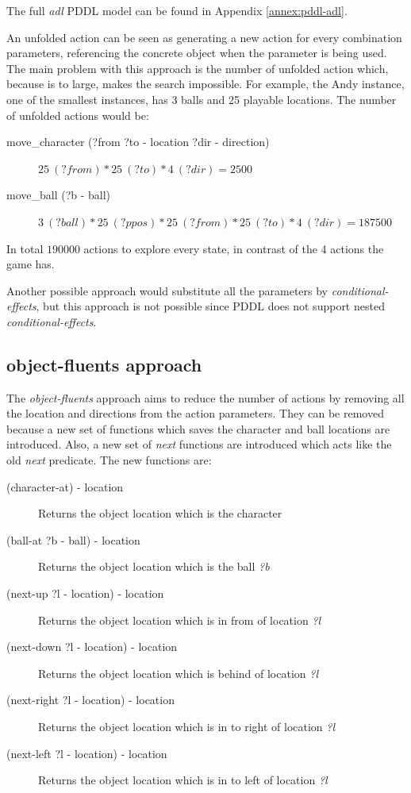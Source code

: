 \documentclass{report}
\theoremstyle{plain}
\begin{document}
The full \emph{adl} PDDL model can be found in Appendix \ref{annex:pddl-adl}.

An unfolded action can be seen as generating a new action for every combination parameters, referencing the concrete object when the parameter is being used. The main problem with this approach is the number of unfolded action which, because is to large, makes the search impossible. For example, the Andy instance, one of the smallest instances, has 3 balls and 25 playable locations. The number of unfolded actions would be:
\begin{description}
    \item[move\_character (?from ?to - location ?dir - direction)] $25\ (?from) * 25\ (?to) * 4\ (?dir) = 2500$
    \item[move\_ball (?b - ball)] $3\ (?ball) * 25\ (?ppos) * 25\ (?from) * 25\ (?to) * 4\ (?dir) = 187500$
\end{description}
In total $190000$ actions to explore every state, in contrast of the 4 actions the game has.

Another possible approach would substitute all the parameters by \emph{conditional-effects}, but this approach is not possible since PDDL does not support nested  \emph{conditional-effects}.

\subsection{object-fluents approach}
The \emph{object-fluents} approach aims to reduce the number of actions by removing all the location and directions from the action parameters. They can be removed because a new set of functions which saves the character and ball locations are introduced. Also, a new set of \emph{next} functions are introduced which acts like the old \emph{next} predicate. The new functions are:
\begin{description}
    \item[(character-at) - location] Returns the object location which is the character
    \item[(ball-at ?b - ball) - location] Returns the object location which is the ball \textit{?b}
    \item[(next-up ?l - location) - location] Returns the object location which is in from of location \textit{?l}
    \item[(next-down ?l - location) - location] Returns the object location which is behind of location \textit{?l}
    \item[(next-right ?l - location) - location] Returns the object location which is in to right of location \textit{?l}
    \item[(next-left ?l - location) - location] Returns the object location which is in to left of location \textit{?l}
\end{description}
\end{document}
